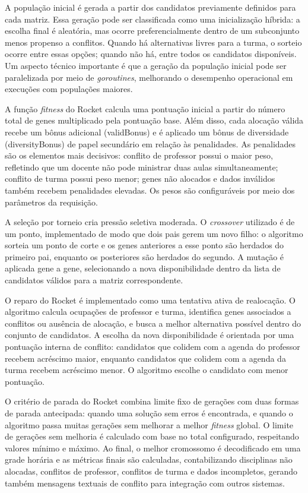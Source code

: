 A população inicial é gerada a partir dos candidatos previamente definidos para cada matriz. Essa geração pode ser classificada como uma inicialização híbrida: a escolha final é aleatória, mas ocorre preferencialmente dentro de um subconjunto menos propenso a conflitos. Quando há alternativas livres para a turma, o sorteio ocorre entre essas opções; quando não há, entre todos os candidatos disponíveis. Um aspecto técnico importante é que a geração da população inicial pode ser paralelizada por meio de \textit{goroutines}, melhorando o desempenho operacional em execuções com populações maiores.

A função \textit{fitness} do Rocket calcula uma pontuação inicial a partir do número total de genes multiplicado pela pontuação base. Além disso, cada alocação válida recebe um bônus adicional (validBonus) e é aplicado um bônus de diversidade (diversityBonus) de papel secundário em relação às penalidades. As penalidades são os elementos mais decisivos: conflito de professor possui o maior peso, refletindo que um docente não pode ministrar duas aulas simultaneamente; conflito de turma possui peso menor; genes não alocados e dados inválidos também recebem penalidades elevadas. Os pesos são configuráveis por meio dos parâmetros da requisição.

A seleção por torneio cria pressão seletiva moderada. O \textit{crossover} utilizado é de um ponto, implementado de modo que dois pais gerem um novo filho: o algoritmo sorteia um ponto de corte e os genes anteriores a esse ponto são herdados do primeiro pai, enquanto os posteriores são herdados do segundo. A mutação é aplicada gene a gene, selecionando a nova disponibilidade dentro da lista de candidatos válidos para a matriz correspondente.

O reparo do Rocket é implementado como uma tentativa ativa de realocação. O algoritmo calcula ocupações de professor e turma, identifica genes associados a conflitos ou ausência de alocação, e busca a melhor alternativa possível dentro do conjunto de candidatos. A escolha da nova disponibilidade é orientada por uma pontuação interna de conflito: candidatos que colidem com a agenda do professor recebem acréscimo maior, enquanto candidatos que colidem com a agenda da turma recebem acréscimo menor. O algoritmo escolhe o candidato com menor pontuação.

O critério de parada do Rocket combina limite fixo de gerações com duas formas de parada antecipada: quando uma solução sem erros é encontrada, e quando o algoritmo passa muitas gerações sem melhorar a melhor \textit{fitness} global. O limite de gerações sem melhoria é calculado com base no total configurado, respeitando valores mínimo e máximo. Ao final, o melhor cromossomo é decodificado em uma grade horária e as métricas finais são calculadas, contabilizando disciplinas não alocadas, conflitos de professor, conflitos de turma e dados incompletos, gerando também mensagens textuais de conflito para integração com outros sistemas.